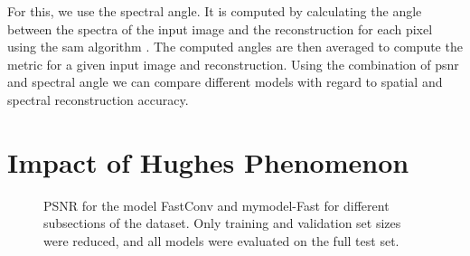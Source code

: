 For this, we use the spectral angle. It is computed by calculating the angle between the spectra of the input image and the reconstruction for each pixel using the \ac{sam} algorithm \citep{kruse_spectral_1993}. The computed angles are then averaged to compute the metric for a given input image and reconstruction. Using the combination of \ac{psnr} and spectral angle we can compare different models with regard to spatial and spectral reconstruction accuracy.
\section{Impact of Hughes Phenomenon \label{sec:ch5hughes}}
\begin{figure}[!ht]
    \centering
{}\datatable
{}
\caption[Comparison for Different Dataset Sizes (PSNR)]{PSNR for the model FastConv and \ac{mymodel}-Fast for different subsections of the dataset. Only training and validation set sizes were reduced, and all models were evaluated on the full test set.}
\label{fig:hughes}
\end{figure}

